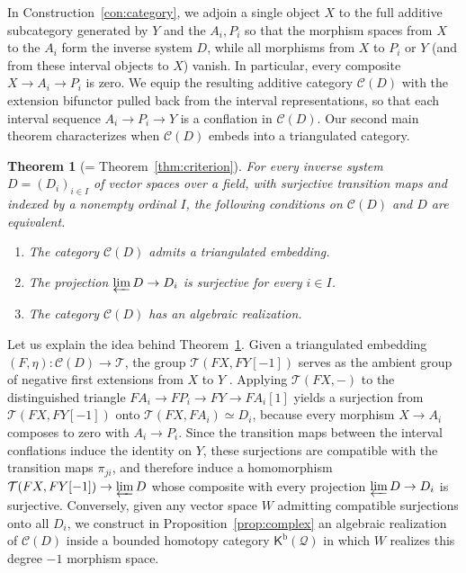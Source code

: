 \documentclass[a4paper,reqno,10pt]{amsart}
\numberwithin{equation}{section}
\newtheorem{introthm}{Theorem}
\theoremstyle{definition}
\newcommand{\C}{\mathcal C}
\newcommand{\T}{\mathcal T}
\newcommand{\Q}{\mathcal Q}
\newcommand{\Kb}{\mathsf K^{\mathrm b}}
\begin{document}
In Construction~\ref{con:category}, we adjoin a single object $X$ to the full
additive subcategory generated by $Y$ and the $A_i,P_i$ so that the morphism
spaces from $X$ to the $A_i$ form the inverse system $D$, while all morphisms
from $X$ to $P_i$ or $Y$ (and from these interval objects to $X$) vanish. In
particular, every composite $X\to A_i\to P_i$ is zero. We equip the resulting
additive category $\C(D)$ with the extension bifunctor pulled back from the
interval representations, so that each interval sequence $A_i\to P_i\to Y$ is a
conflation in $\C(D)$. Our second main theorem characterizes when $\C(D)$
embeds into a triangulated category.

\begin{introthm}[= Theorem~\ref{thm:criterion}]\label{intro:criterion}
For every inverse system $D=(D_i)_{i\in I}$ of vector spaces over a field,
with surjective transition maps and indexed by a nonempty ordinal $I$, the
following conditions on $\C(D)$ and $D$ are equivalent.
\begin{enumerate}
\item The category $\C(D)$ admits a triangulated embedding.
\item The projection $\varprojlim D\to D_i$ is surjective for every $i\in I$.
\item The category $\C(D)$ has an algebraic realization.
\end{enumerate}
\end{introthm}

Let us explain the idea behind Theorem~\ref{intro:criterion}. Given a
triangulated embedding $(F,\eta):\C(D)\to\T$, the group $\T(FX,FY[-1])$ serves
as the ambient group of negative first extensions from $X$ to $Y$
\cite[\S5.5]{GNP}. Applying $\T(FX,-)$ to the distinguished triangle
$FA_i\to FP_i\to FY\to FA_i[1]$ yields a surjection from $\T(FX,FY[-1])$ onto
$\T(FX,FA_i)\simeq D_i$, because every morphism $X\to A_i$ composes to zero
with $A_i\to P_i$. Since the transition maps between the interval conflations
induce the identity on $Y$, these surjections are compatible with the
transition maps $\pi_{ji}$, and therefore induce a homomorphism
$\T(FX,FY[-1])\to\varprojlim D$ whose composite with every projection
$\varprojlim D\to D_i$ is surjective. Conversely, given any vector space $W$
admitting compatible surjections onto all $D_i$, we construct in
Proposition~\ref{prop:complex} an algebraic realization of $\C(D)$ inside a
bounded homotopy category $\Kb(\Q)$ in which $W$ realizes this degree $-1$
morphism space.
\end{document}
